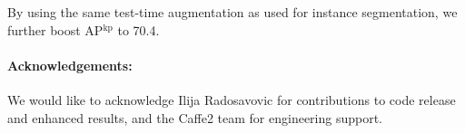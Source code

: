 \documentclass[10pt,twocolumn,letterpaper]{article}
\begin{document}
By using the same test-time augmentation as used for instance segmentation, we further boost AP$^\text{kp}$ to 70.4.

\paragraph{Acknowledgements:} We would like to acknowledge Ilija Radosavovic for contributions to code release and enhanced results, and the Caffe2 team for engineering support.

{\small}
\end{document}
